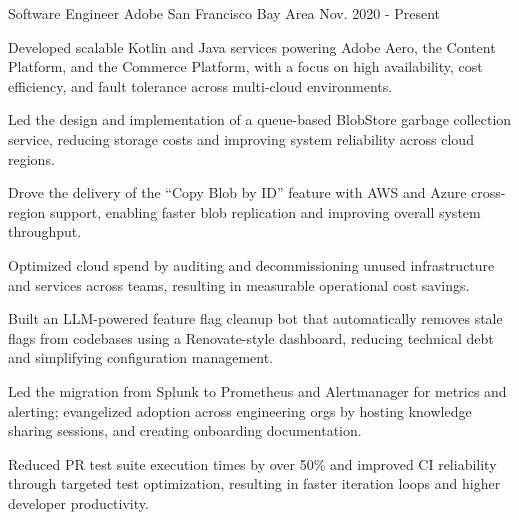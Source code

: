 


\begin{cventries}


\cventry
{Software Engineer} %
{Adobe} %
{San Francisco Bay Area} %
{Nov. 2020 - Present} %
{ %
\begin{cvitems}
\item {Developed scalable Kotlin and Java services powering Adobe Aero, the Content Platform, and the Commerce Platform, with a focus on high availability, cost efficiency, and fault tolerance across multi-cloud environments.}
\item {Led the design and implementation of a queue-based BlobStore garbage collection service, reducing storage costs and improving system reliability across cloud regions.}
\item {Drove the delivery of the ``Copy Blob by ID'' feature with AWS and Azure cross-region support, enabling faster blob replication and improving overall system throughput.}
\item {Optimized cloud spend by auditing and decommissioning unused infrastructure and services across teams, resulting in measurable operational cost savings.}
\item {Built an LLM-powered feature flag cleanup bot that automatically removes stale flags from codebases using a Renovate-style dashboard, reducing technical debt and simplifying configuration management.}
\item {Led the migration from Splunk to Prometheus and Alertmanager for metrics and alerting; evangelized adoption across engineering orgs by hosting knowledge sharing sessions, and creating onboarding documentation.}
\item {Reduced PR test suite execution times by over 50\% and improved CI reliability through targeted test optimization, resulting in faster iteration loops and higher developer productivity.}

\end{cvitems}}
\end{cventries}
